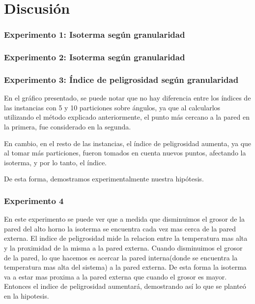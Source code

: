 \section{Discusión}


\subsubsection*{Experimento 1: Isoterma según granularidad}
\subsubsection*{Experimento 2: Isoterma según granularidad}

\subsubsection*{Experimento 3: Índice de peligrosidad según granularidad}
  	En el gráfico presentado, se puede notar que no hay diferencia entre los índices de las instancias con 5 y 10 particiones sobre ángulos, ya que al calcularlos utilizando el método explicado anteriormente, el punto más cercano a la pared en la primera, fue considerado en la segunda. 

  	En cambio, en el resto de las instancias, el índice de peligrosidad aumenta, ya que al tomar más particiones, fueron tomados en cuenta nuevos puntos, afectando la isoterma, y por lo tanto, el índice. 

  	De esta forma, demostramos experimentalmente nuestra hipótesis. 


\subsubsection*{Experimento 4}
	En este experimento se puede ver que a medida que disminuimos el grosor de la pared del alto horno la isoterma se encuentra cada vez mas cerca de la pared externa. El indice de peligrosidad mide la relacion entre la temperatura mas alta y la proximidad de la misma a la pared externa. Cuando disminuimos el grosor de la pared, lo que hacemos es acercar la pared interna(donde se encuentra la temperatura mas alta del sistema) a la pared externa. De esta forma la isoterma va a estar mas proxima a la pared externa que cuando el grosor es mayor. Entonces el indice de peligrosidad aumentará, demostrando así lo que se planteó en la hipotesis.
	

